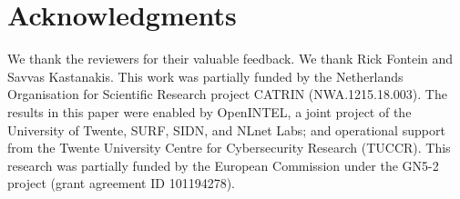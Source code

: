 \section*{Acknowledgments}
We thank the reviewers for their valuable feedback.
We thank Rick Fontein and Savvas Kastanakis.
This work was partially funded by the Netherlands Organisation for Scientific Research project CATRIN (NWA.1215.18.003).
The results in this paper were enabled by OpenINTEL, a joint project of the University of Twente, SURF, SIDN, and NLnet Labs; and operational support from the Twente University Centre for Cybersecurity Research (TUCCR).
This research was partially funded by the European Commission under the GN5-2 project (grant agreement ID 101194278).
